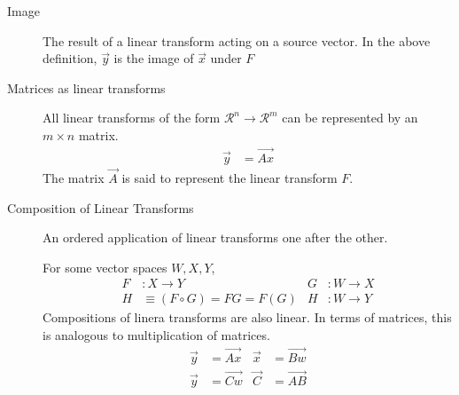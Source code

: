 \begin{description}
    \item[Image] The result of a linear transform acting on a source vector.
        In the above definition, $ \vec{y} $ is the image of $ \vec{x} $
        under $ F $

    \item[Matrices as linear transforms] All linear transforms of the form
        $ \mathcal{R}^n \rightarrow \mathcal{R}^m $ can be represented by an
        $ m \times n $ matrix.
        \begin{align}
            \vec{y} & = \vec{Ax}
        \end{align}
        The matrix $ \vec{A} $ is said to represent the linear transform $ F $.

    \item[Composition of Linear Transforms] An ordered application of linear transforms
        one after the other. \par
        For some vector spaces $ W, X, Y $,
        \begin{align}
            F & : X \rightarrow Y              & G & : W \rightarrow X \\
            H & \equiv (F \circ G) = FG = F(G) & H & : W \rightarrow Y
        \end{align}
        Compositions of linera transforms are also linear. In terms of matrices, this
        is analogous to multiplication of matrices.
        \begin{align}
            \vec{y} &= \vec{Ax} & \vec{x} &= \vec{Bw} \\
            \vec{y} &= \vec{Cw} & \vec{C} &= \vec{AB}
        \end{align}

\end{description}